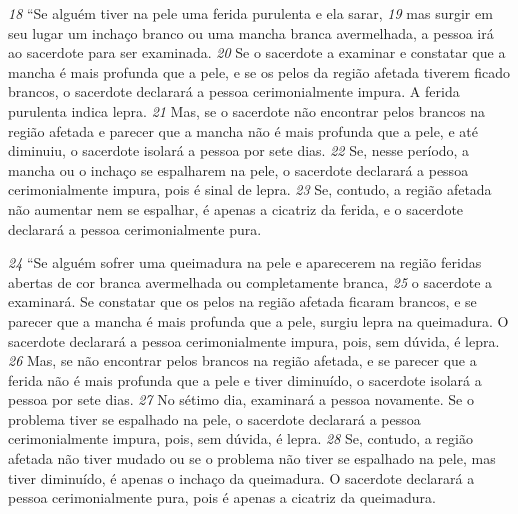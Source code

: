 \bigskip 
\textit{\tiny 18}
“Se alguém tiver na pele uma ferida purulenta e ela sarar, 
\textit{\tiny 19}
mas surgir em
seu lugar um inchaço branco ou uma mancha branca avermelhada, a pessoa irá ao
sacerdote para ser examinada. 
\textit{\tiny 20}
Se o sacerdote a examinar e constatar que a
mancha é mais profunda que a pele, e se os pelos da região afetada tiverem ficado
brancos, o sacerdote declarará a pessoa cerimonialmente impura. A ferida
purulenta indica lepra. 
\textit{\tiny 21}
Mas, se o sacerdote não encontrar pelos brancos na
região afetada e parecer que a mancha não é mais profunda que a pele, e até
diminuiu, o sacerdote isolará a pessoa por sete dias. 
\textit{\tiny 22}
Se, nesse período, a mancha
ou o inchaço se espalharem na pele, o sacerdote declarará a pessoa
cerimonialmente impura, pois é sinal de lepra. 
\textit{\tiny 23}
Se, contudo, a região afetada não
aumentar nem se espalhar, é apenas a cicatriz da ferida, e o sacerdote declarará a
pessoa cerimonialmente pura.
   
\bigskip 
\textit{\tiny 24}
“Se alguém sofrer uma queimadura na pele e aparecerem na região feridas
abertas de cor branca avermelhada ou completamente branca, 
\textit{\tiny 25}
o sacerdote a
examinará. Se constatar que os pelos na região afetada ficaram brancos, e se
parecer que a mancha é mais profunda que a pele, surgiu lepra na queimadura. O
sacerdote declarará a pessoa cerimonialmente impura, pois, sem dúvida, é lepra.
\textit{\tiny 26}
Mas, se não encontrar pelos brancos na região afetada, e se parecer que a ferida
não é mais profunda que a pele e tiver diminuído, o sacerdote isolará a pessoa por
sete dias. 
\textit{\tiny 27}
No sétimo dia, examinará a pessoa novamente. Se o problema tiver se
espalhado na pele, o sacerdote declarará a pessoa cerimonialmente impura, pois,
sem dúvida, é lepra. 
\textit{\tiny 28}
Se, contudo, a região afetada não tiver mudado ou se o
problema não tiver se espalhado na pele, mas tiver diminuído, é apenas o inchaço
da queimadura. O sacerdote declarará a pessoa cerimonialmente pura, pois é
apenas a cicatriz da queimadura.
   
